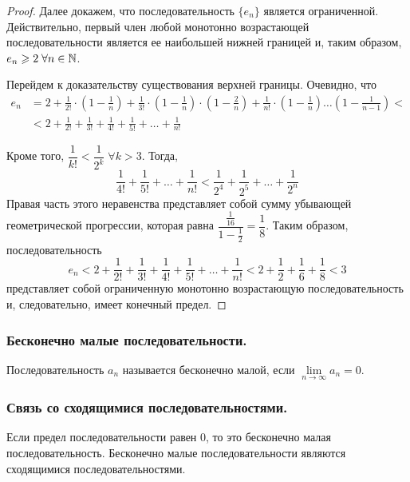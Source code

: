 \documentclass[12pt, a4paper]{article}
\begin{document}
\begin{proof}
		Далее докажем, что последовательность $\{e_n\}$ является ограниченной. Действительно, первый член любой монотонно возрастающей последовательности является ее наибольшей нижней границей и, таким образом, $e_n \geqslant 2 \; \forall n \in \mathbb{N}$.

		Перейдем к доказательству существования верхней границы. Очевидно, что
		\begin{align*}
			e_n 
			&= 2 + \frac{1}{2!} \cdot \left(1 - \frac{1}{n}\right) + \frac{1}{3!} \cdot \left(1 - \frac{1}{n}\right) \cdot \left(1 - \frac{2}{n}\right) + \frac{1}{n!} \cdot \left(1 - \frac{1}{n}\right) \dots \left(1 - \frac{1}{n - 1}\right) <\\
			&< 2 + \frac{1}{2!} + \frac{1}{3!} + \frac{1}{4!} + \frac{1}{5!} + \dots + \frac{1}{n!}
		\end{align*}

		Кроме того, $\dfrac{1}{k!} < \dfrac{1}{2^k} \; \forall k > 3$. Тогда,
		\begin{equation*}
			\frac{1}{4!} + \frac{1}{5!} + \dots + \frac{1}{n!} < 
			\frac{1}{2^4} + \frac{1}{2^5} + \dots + \frac{1}{2^n}
		\end{equation*}
		Правая часть этого неравенства представляет собой сумму убывающей геометрической прогрессии, которая равна $\dfrac{\frac{1}{16}}{1 - \frac{1}{2}} = \dfrac{1}{8}$. Таким образом, последовательность
		\begin{equation*}
			e_n < 2 + \frac{1}{2!} + \frac{1}{3!} + \frac{1}{4!} + \frac{1}{5!} + \dots + \frac{1}{n!}
			< 2 + \frac{1}{2} + \frac{1}{6} + \frac{1}{8} < 3
		\end{equation*}
		представляет собой ограниченную монотонно возрастающую последовательность и, следовательно, имеет конечный предел.
	\end{proof}

	\subsubsection{Бесконечно малые последовательности.}
	Последовательность $a_n$ называется бесконечно малой, если $\lim\limits_{n \to \infty} a_n = 0$.

	\subsubsection{Связь со сходящимися последовательностями.}
	Если предел последовательности равен 0, то это бесконечно малая последовательность. Бесконечно малые последовательности являются сходящимися последовательностями.
\end{document}
